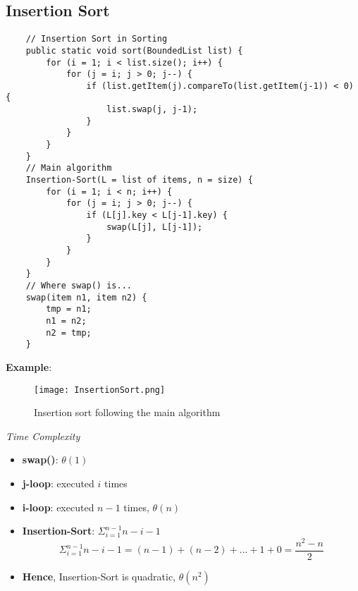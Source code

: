 \documentclass[10pt, 
a4paper, 
oneside, 
headinclude, footinclude, 
BCOR5mm]
{scrartcl}
\begin{document}
\subsection{Insertion Sort}
\begin{lstlisting}
    // Insertion Sort in Sorting
    public static void sort(BoundedList list) {
        for (i = 1; i < list.size(); i++) {
            for (j = i; j > 0; j--) {
                if (list.getItem(j).compareTo(list.getItem(j-1)) < 0) {
                    list.swap(j, j-1);
                }
            }
        }
    }
    // Main algorithm
    Insertion-Sort(L = list of items, n = size) {
        for (i = 1; i < n; i++) {
            for (j = i; j > 0; j--) {
                if (L[j].key < L[j-1].key) {
                    swap(L[j], L[j-1]);
                }
            }
        }
    }
    // Where swap() is...
    swap(item n1, item n2) {
        tmp = n1;
        n1 = n2;
        n2 = tmp;
    }
\end{lstlisting}
\textbf{Example}:
\begin{figure}[H]
    \begin{center}
        \texttt{[image: InsertionSort.png]}
        \caption{Insertion sort following the main algorithm}
    \end{center}
\end{figure}

\begin{definition}
    \textit{Time Complexity}
    \begin{itemize}
        \item \textbf{swap()}: $\theta(1)$
        \item \textbf{j-loop}: executed $i$ times
        \item \textbf{i-loop}: executed $n-1$ times, $\theta(n)$
        \item \textbf{Insertion-Sort}: $\Sigma^{n-1}_{i=1}n-i-1$ $$\Sigma^{n-1}_{i=1}n-i-1=(n-1)+(n-2)+...+1+0=\frac{n^2-n}{2}$$
        \item \textbf{Hence}, Insertion-Sort is quadratic, $\theta(n^2)$
    \end{itemize}
\end{definition}

\end{document}
